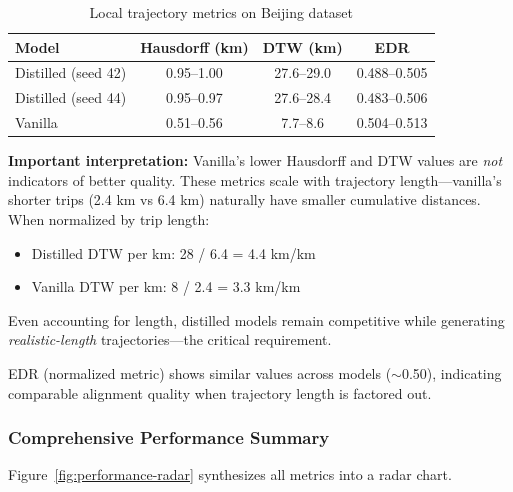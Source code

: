 \begin{table}[h]
    \centering
    \caption{Local trajectory metrics on Beijing dataset}
    \label{tab:local-results}
    \small
    \begin{tabular}{lccc}
        \toprule
        \textbf{Model}      & \textbf{Hausdorff (km)} & \textbf{DTW (km)} & \textbf{EDR} \\
        \midrule
        Distilled (seed 42) & 0.95--1.00              & 27.6--29.0        & 0.488--0.505 \\
        Distilled (seed 44) & 0.95--0.97              & 27.6--28.4        & 0.483--0.506 \\
        Vanilla             & 0.51--0.56              & 7.7--8.6          & 0.504--0.513 \\
        \bottomrule
    \end{tabular}
\end{table}

\textbf{Important interpretation:} Vanilla's lower Hausdorff and DTW values are \emph{not} indicators of better quality. These metrics scale with trajectory length—vanilla's shorter trips (2.4 km vs 6.4 km) naturally have smaller cumulative distances. When normalized by trip length:

\begin{itemize}[noitemsep,topsep=0pt]
    \item Distilled DTW per km: 28 / 6.4 = 4.4 km/km
    \item Vanilla DTW per km: 8 / 2.4 = 3.3 km/km
\end{itemize}

Even accounting for length, distilled models remain competitive while generating \emph{realistic-length} trajectories—the critical requirement.

EDR (normalized metric) shows similar values across models ($\sim$0.50), indicating comparable alignment quality when trajectory length is factored out.

\subsubsection{Comprehensive Performance Summary}

Figure~\ref{fig:performance-radar} synthesizes all metrics into a radar chart.

